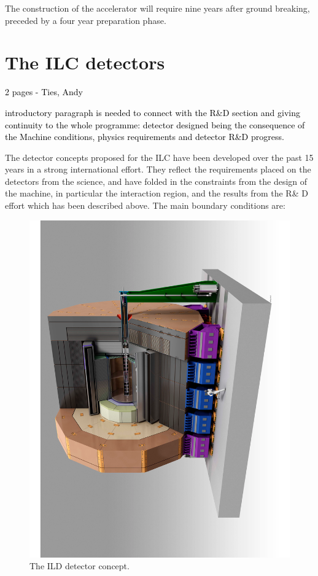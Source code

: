 \documentclass[%
 reprint,
 amsmath,amssymb,
 aps,
]{revtex4-1}
\newcommand{\todo}[1]{\textcolor{black}{{#1}}}
\begin{document}
The construction of the accelerator will require nine years after ground breaking, preceded by a four year preparation phase.




\section{\label{sec:detect} The ILC detectors}

\todo{ 2 pages - Ties, Andy}

\todo{introductory paragraph is needed to connect with the R\&D section and giving continuity to the whole programme: detector designed being the consequence of the Machine conditions, physics requirements and detector R\&D progress.}

The detector concepts proposed for the ILC have been developed over the past 15 years in a strong international effort. They reflect the requirements placed on the detectors from the science, and have folded in the constraints from the design of the machine, in particular the interaction region, and the results from the R\& D effort which has been described above.  
The main boundary conditions are: 
\begin{figure}[tb]
 \begin{center}
 \includegraphics[width=0.8\hsize,angle=-90]{figures/ILD.pdf}
\caption{The ILD detector concept.
\label{fig_ild}}
 \end{center}
 \end{figure}
 
\end{document}
